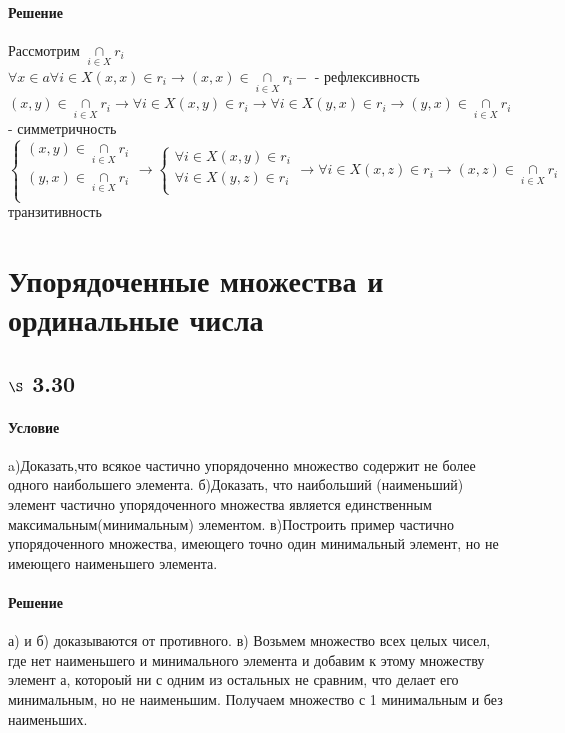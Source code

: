 \documentclass[a4paper,12pt]{article}
\DeclareMathOperator*{\mycap}{\cap}
\begin{document}
\paragraph*{Решение}
Рассмотрим $\mycap\limits_{i \in X} r_i $\\
$\forall x \in a  \forall i \in X (x,x) \in r_i \rightarrow (x,x) \in \mycap\limits_{i \in X} r_i -$ - рефлексивность\\
$(x,y) \in \mycap\limits_{i \in X} r_i \rightarrow \forall i \in X (x,y) \in r_i \rightarrow \forall i \in X (y,x) \in r_i \rightarrow (y,x) \in \mycap\limits_{i \in X} r_i$ - симметричность\\
\begin{equation*}
\begin{cases} 
(x,y) \in  \mycap\limits_{i \in X} r_i \\
(y,x) \in  \mycap\limits_{i \in X} r_i \\
\end{cases} \rightarrow
\begin{cases} 
\forall i \in X (x,y) \in   r_i \\
\forall i \in X (y,z) \in   r_i \\
\end{cases} 
\rightarrow
\forall i \in X (x,z) \in r_i \rightarrow (x,z) \in \mycap\limits_{i \in X} r_i
\end{equation*}
транзитивность
\section{Упорядоченные множества и ординальные числа}
\subsection*{$\S$ 3.30}
\paragraph*{Условие}
a)Доказать,что всякое частично упорядоченно множество содержит не более одного наибольшего элемента.
б)Доказать, что наибольший (наименьший) элемент частично упорядоченного множества является единственным максимальным(минимальным) элементом.
в)Построить пример частично упорядоченного множества, имеющего точно один минимальный элемент, но не имеющего наименьшего элемента.
\paragraph*{Решение}
а) и б) доказываются от противного.
в) Возьмем множество всех целых чисел, где нет наименьшего и минимального элемента и добавим к этому множеству элемент а, котороый ни с одним из остальных не сравним, что делает его минимальным, но не наименьшим. Получаем множество с 1 минимальным и без наименьших.
\end{document}
